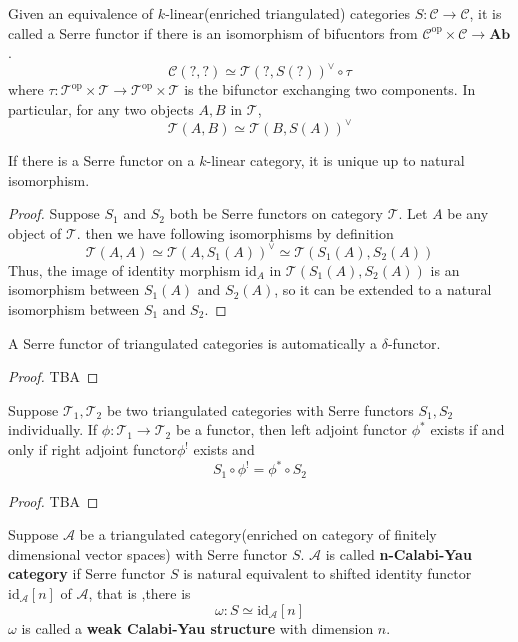Given an equivalence of $k$-linear(enriched triangulated) categories $S: \mathcal{C} \rightarrow \mathcal{C}$, it is called a Serre functor if there is an isomorphism of bifucntors from $ \mathcal{C}^{\text{op}} \times \mathcal{C} \rightarrow \mathbf{Ab}$.
\[
\mathcal{C}(?,?) \simeq \mathcal{T}(?,S(?))^{\vee} \circ \tau
\]
where $\tau: \mathcal{T}^{\text{op}} \times \mathcal{T} \rightarrow \mathcal{T}^{\text{op}} \times \mathcal{T}$ is the bifunctor  exchanging two components. In particular, for any two objects $A,B$ in $\mathcal{T}$,
\[
\mathcal{T}(A,B) \simeq \mathcal{T}(B,S(A))^{\vee}
\]

\begin{prop}
If there is a Serre functor on a $k$-linear category, it is unique up to natural isomorphism.
\end{prop}
\begin{proof}
Suppose $S_1$ and $S_2$ both be Serre functors on category $\mathcal{T}$. Let $A$ be any object of $\mathcal{T}$. then we have following isomorphisms by definition
\[
\mathcal{T}(A,A) \simeq \mathcal{T}(A, S_1(A))^{\vee} \simeq \mathcal{T}(S_1(A),S_2(A))
\]
Thus, the image of identity morphism $\text{id}_A$ in $\mathcal{T}(S_1(A),S_2(A))$ is an isomorphism between $S_1(A)$ and $S_2(A)$, so it can be extended to a natural isomorphism between $S_1$ and $S_2$.
\end{proof}

\begin{prop}
A Serre functor of triangulated categories is automatically a $\delta $-functor.
\end{prop}
\begin{proof}
TBA
\end{proof}

\begin{prop}
Suppose $\mathcal{T}_1,\mathcal{T}_2$ be two triangulated categories with Serre functors $S_1,S_2$ individually. If $ \phi : \mathcal{T}_1 \rightarrow \mathcal{T}_2$ be a functor, then left adjoint functor $\phi^{*}$ exists if and only if right adjoint functor$\phi^{!}$ exists and 
\[
S_1 \circ \phi^{!} = \phi^{*} \circ S_2
\]
\end{prop}
\begin{proof}
	TBA
\end{proof}
\begin{mydefn}
Suppose $\mathcal{A}$ be a triangulated category(enriched on category of finitely dimensional vector spaces) with Serre functor $S$. $\mathcal{A}$ is called \textbf{n-Calabi-Yau category} if Serre functor $S$ is natural equivalent to shifted identity functor $\text{id}_{\mathcal{A}}[n]$ of $\mathcal{A}$, that is ,there is 
\[
\omega : S \simeq \text{id}_{\mathcal{A}}[n]
\]
$\omega$ is called a \textbf{weak Calabi-Yau structure} with dimension $n$.
\end{mydefn}